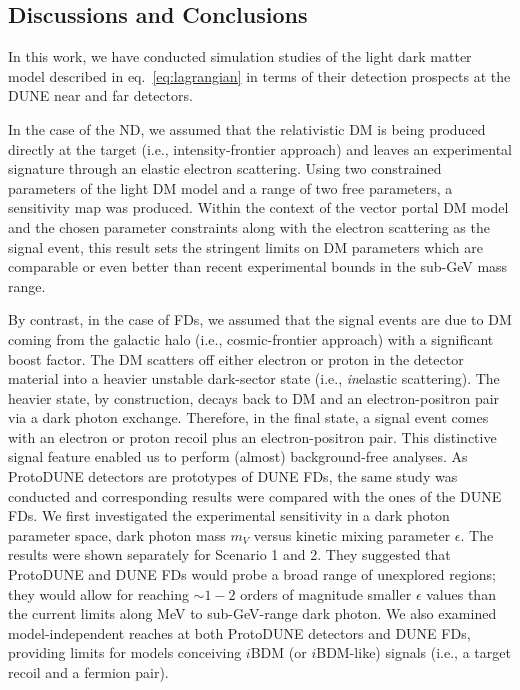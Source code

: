 \subsection{Discussions and Conclusions}

In this work, we have conducted simulation studies of the light dark matter model described in eq.~\eqref{eq:lagrangian} in terms of their detection prospects at the DUNE near and far detectors. 

In the case of the ND, we assumed that the relativistic DM is being produced directly at the target (i.e., intensity-frontier approach) and leaves an experimental signature through an elastic electron scattering. Using two constrained parameters of the light DM model and a range of two free parameters, a sensitivity map was produced. Within the context of the vector portal DM model and the chosen parameter constraints along with the electron scattering as the signal event, this result sets the stringent limits on DM parameters which are comparable or even better than recent experimental bounds in the sub-GeV mass range.

By contrast, in the case of FDs, we assumed that the signal events are due to DM coming from the galactic halo (i.e., cosmic-frontier approach) with a significant boost factor. The DM scatters off either electron or proton in the detector material into a heavier unstable dark-sector state (i.e., {\it in}elastic scattering). 
The heavier state, by construction, decays back to DM and an electron-positron pair via a dark photon exchange. 
Therefore, in the final state, a signal event comes with an electron or proton recoil plus an electron-positron pair. 
This distinctive signal feature enabled us to perform (almost) background-free analyses. 
As ProtoDUNE detectors are prototypes of DUNE FDs, the same study was conducted and corresponding results were compared with the ones of the DUNE FDs. 
We first investigated the experimental sensitivity in a dark photon parameter space, dark photon mass $m_V$ versus kinetic mixing parameter $\epsilon$. 
The results were shown separately for Scenario 1 and 2. 
They suggested that ProtoDUNE and DUNE FDs would probe a broad range of unexplored regions; they would allow for reaching $\sim 1-2$ orders of magnitude smaller $\epsilon$ values than the current limits along MeV to sub-GeV-range dark photon. 
We also examined model-independent reaches at both ProtoDUNE detectors and DUNE FDs, providing limits for models conceiving $i$BDM (or $i$BDM-like) signals (i.e., a target recoil and a fermion pair). 



